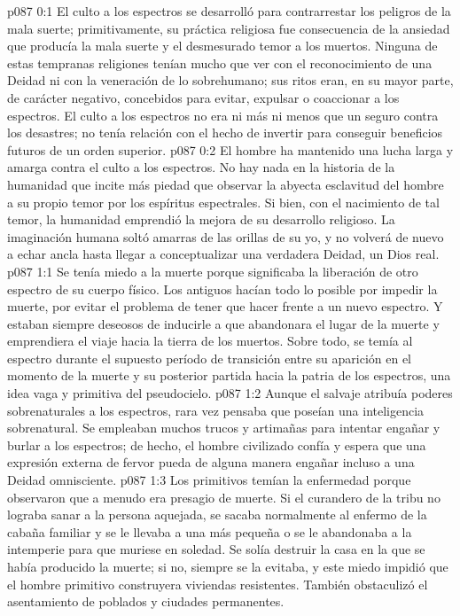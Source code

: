 \author{Brillante estrella vespertina}
\vs p087 0:1 El culto a los espectros se desarrolló para contrarrestar los peligros de la mala suerte; primitivamente, su práctica religiosa fue consecuencia de la ansiedad que producía la mala suerte y el desmesurado temor a los muertos. Ninguna de estas tempranas religiones tenían mucho que ver con el reconocimiento de una Deidad ni con la veneración de lo sobrehumano; sus ritos eran, en su mayor parte, de carácter negativo, concebidos para evitar, expulsar o coaccionar a los espectros. El culto a los espectros no era ni más ni menos que un seguro contra los desastres; no tenía relación con el hecho de invertir para conseguir beneficios futuros de un orden superior.
\vs p087 0:2 El hombre ha mantenido una lucha larga y amarga contra el culto a los espectros. No hay nada en la historia de la humanidad que incite más piedad que observar la abyecta esclavitud del hombre a su propio temor por los espíritus espectrales. Si bien, con el nacimiento de tal temor, la humanidad emprendió la mejora de su desarrollo religioso. La imaginación humana soltó amarras de las orillas de su yo, y no volverá de nuevo a echar ancla hasta llegar a conceptualizar una verdadera Deidad, un Dios real.
\vs p087 1:1 Se tenía miedo a la muerte porque significaba la liberación de otro espectro de su cuerpo físico. Los antiguos hacían todo lo posible por impedir la muerte, por evitar el problema de tener que hacer frente a un nuevo espectro. Y estaban siempre deseosos de inducirle a que abandonara el lugar de la muerte y emprendiera el viaje hacia la tierra de los muertos. Sobre todo, se temía al espectro durante el supuesto período de transición entre su aparición en el momento de la muerte y su posterior partida hacia la patria de los espectros, una idea vaga y primitiva del pseudocielo.
\vs p087 1:2 Aunque el salvaje atribuía poderes sobrenaturales a los espectros, rara vez pensaba que poseían una inteligencia sobrenatural. Se empleaban muchos trucos y artimañas para intentar engañar y burlar a los espectros; de hecho, el hombre civilizado confía y espera que una expresión externa de fervor pueda de alguna manera engañar incluso a una Deidad omnisciente.
\vs p087 1:3 Los primitivos temían la enfermedad porque observaron que a menudo era presagio de muerte. Si el curandero de la tribu no lograba sanar a la persona aquejada, se sacaba normalmente al enfermo de la cabaña familiar y se le llevaba a una más pequeña o se le abandonaba a la intemperie para que muriese en soledad. Se solía destruir la casa en la que se había producido la muerte; si no, siempre se la evitaba, y este miedo impidió que el hombre primitivo construyera viviendas resistentes. También obstaculizó el asentamiento de poblados y ciudades permanentes.
